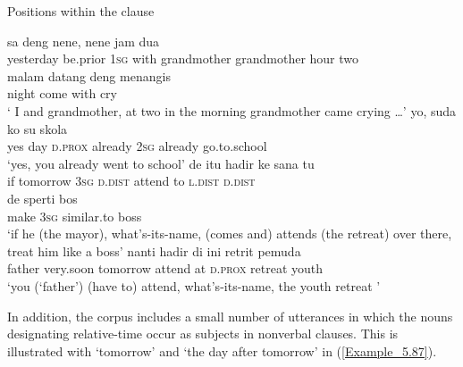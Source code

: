 \begin{styleExampleTitle}
Positions within the clause
\end{styleExampleTitle}

\ea
\label{Example_5.83}
 {{}} {{sa}} {deng} {nene}, {nene} {jam} {dua}\\ %
 {yesterday}  {be.prior}  {\textsc{1sg}}  with  grandmother  grandmother  hour  two\\
 \gll  malam  {datang}  {deng}  {menangis}\\
 night  {come}  {with}  {cry}\\
\glt 
‘ I and grandmother, at two in the morning grandmother came crying {\ldots}’ \textstyleExampleSource{[081014-008-CvNP.0001]}
\z
\ea
\label{Example_5.84}
\gll  yo,      suda  ko  su  skola\\
 yes  day  \textsc{d.prox}  already  \textsc{2sg}  already  go.to.school\\
\glt 
‘yes,  you already went to school’ \textstyleExampleSource{[080917-003a-CvEx.0006]}
\z
\ea
\label{Example_5.85}
 {{}} {de} {{itu}} {hadir} {ke} {sana} {tu}\\ %
 if  {tomorrow}  \textsc{3sg}  {\textsc{d.dist}}  attend  to  \textsc{l.dist}  \textsc{d.dist}\\
   de  {sperti}  {bos}\\
 {make}  \textsc{3sg}  {similar.to}  {boss}\\
 ‘if  he (the mayor), what’s-its-name, (comes and) attends (the retreat) over there, treat him like a boss’ \textstyleExampleSource{[081025-009a-Cv.0172]}
\z
\ea
\label{Example_5.86}
 {nanti} {} {hadir} {di} {ini} {retrit} {pemuda}\\ %
 father  very.soon  tomorrow  attend  at  \textsc{d.prox}  retreat  youth\\
 ‘you (‘father’) (have to) attend, what’s-its-name, the youth retreat ’ \textstyleExampleSource{[081025-009a-Cv.0175]}
\z


In addition, the corpus includes a small number of utterances in which the nouns designating relative-time occur as subjects in nonverbal clauses. This is illustrated with  ‘tomorrow’ and  ‘the day after tomorrow’ in (\ref{Example_5.87}).


